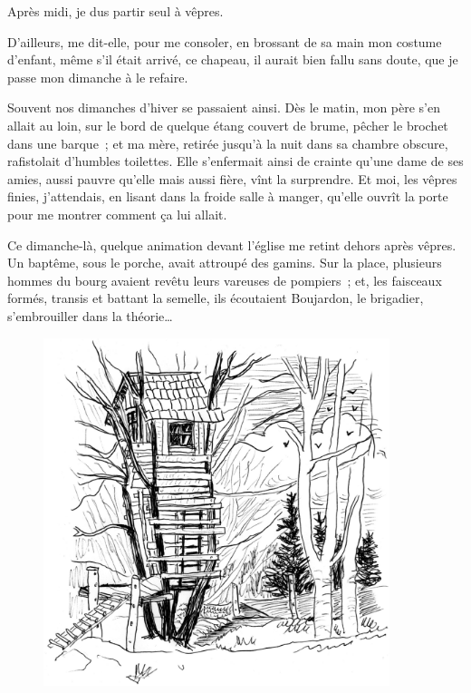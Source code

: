 \documentclass[petitlivre]{livrelitt}
\begin{document}
Après midi, je dus partir seul à vêpres.

D'ailleurs, me dit-elle, pour me consoler, en brossant de sa main mon costume d'enfant, même s'il était arrivé, ce chapeau, il aurait bien fallu sans doute, que je passe mon dimanche à le refaire.

Souvent nos dimanches d'hiver se passaient ainsi. Dès le matin, mon père s'en allait au loin, sur le bord de quelque étang couvert de brume, pêcher le brochet dans une barque ; et ma mère, retirée jusqu'à la nuit dans sa chambre obscure, rafistolait d'humbles toilettes. Elle s'enfermait ainsi de crainte qu'une dame de ses amies, aussi pauvre qu'elle mais aussi fière, vînt la surprendre. Et moi, les vêpres finies, j'attendais, en lisant dans la froide salle à manger, qu'elle ouvrît la porte pour me montrer comment ça lui allait.

Ce dimanche-là, quelque animation devant l'église me retint dehors après vêpres. Un baptême, sous le porche, avait attroupé des gamins. Sur la place, plusieurs hommes du bourg avaient revêtu leurs vareuses de pompiers ; et, les faisceaux formés, transis et battant la semelle, ils écoutaient Boujardon, le brigadier, s'embrouiller dans la théorie…

\begin{figure}[!p]
\includegraphics[width=0.9\textwidth]{cabane-dessin.jpg}
\end{figure}
\end{document}
